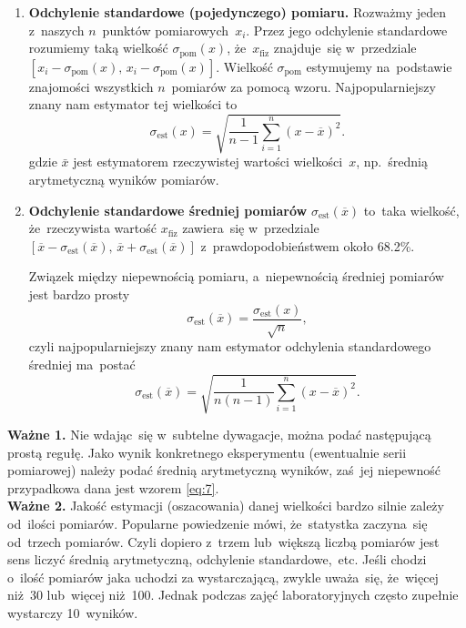 \documentclass[a4paper,11pt]{article}
\newcommand{\tb}{\textbf}
\begin{document}
\begin{enumerate}
\item \tb{Odchylenie standardowe (pojedynczego) pomiaru.} Rozważmy
  jeden z~naszych $n$~punktów pomiarowych~$x_{ i }$. Przez jego
  odchylenie standardowe rozumiemy taką wielkość
  $\sigma_{ \textrm{pom} }( x )$, że~$x_{ \textrm{fiz} }$ znajduje~się
  w~przedziale
  $[ x_{ i } - \sigma_{ \textrm{pom} }( x ),\, x_{ i } - \sigma_{
    \textrm{pom} }( x ) ]$. Wielkość $\sigma_{ \textrm{pom} }$
  estymujemy na~podstawie znajomości wszystkich $n$~pomiarów za pomocą
  wzoru. Najpopularniejszy znany nam estymator tej wielkości to
  \begin{equation}
    \label{eq:5}
    \sigma_{ \textrm{est} }( x )
    = \sqrt{ \frac{ 1 }{ n - 1 }
      \sum_{ i = 1 }^{ n } ( x - \overline{x} )^{ 2 } }.
  \end{equation}
  gdzie $\bar x$ jest estymatorem rzeczywistej wartości wielkości~$x$,
  np.~średnią arytmetyczną wyników pomiarów.

\item \tb{Odchylenie standardowe średniej pomiarów}
  $\sigma_{ \textrm{est} }( \overline{x} )$ to~taka wielkość,
  że~rzeczywista wartość $x_{ \textrm{fiz} }$ zawiera~się w~przedziale
  $[ \overline{x} - \sigma_{ \textrm{est} }( \overline{x} ),\,
  \overline{x} + \sigma_{ \textrm{est} }( \overline{x} ) ]$
  z~prawdopodobieństwem około 68.2\%.

  Związek między niepewnością pomiaru, a~niepewnością średniej
  pomiarów jest bardzo prosty
  \begin{equation}
    \label{eq:6}
    \sigma_{ \textrm{est} }( \overline{x} )
    = \frac{ \sigma_{ \textrm{est} }( x ) }{ \sqrt{ n } },
  \end{equation}
  czyli najpopularniejszy znany nam estymator odchylenia standardowego
  średniej ma~postać
  \begin{equation}
    \label{eq:7}
    \sigma_{ \textrm{est} }( \overline{x} ) = \sqrt{ \frac{ 1 }{ n ( n - 1 ) }
      \sum_{ i = 1 }^{ n } ( x - \overline{x} )^{ 2 } }.
  \end{equation}
\end{enumerate}
\tb{Ważne 1.} Nie wdając~się w~subtelne dywagacje, można podać
następującą prostą regułę. Jako wynik konkretnego eksperymentu
(ewentualnie serii pomiarowej) należy podać średnią arytmetyczną
wyników, zaś~jej niepewność przypadkowa dana jest wzorem \eqref{eq:7}. \\
\tb{Ważne 2.} Jakość estymacji (oszacowania) danej wielkości bardzo
silnie zależy od~ilości pomiarów. Popularne powiedzenie mówi,
że~statystka zaczyna~się od~trzech pomiarów. Czyli dopiero z~trzem
lub~większą liczbą pomiarów jest sens liczyć średnią arytmetyczną,
odchylenie standardowe,~etc. Jeśli chodzi o~ilość pomiarów jaka
uchodzi za wystarczającą, zwykle uważa~się, że~więcej niż~30
lub~więcej niż~100. Jednak podczas zajęć laboratoryjnych często
zupełnie wystarczy 10~wyników.
\end{document}
